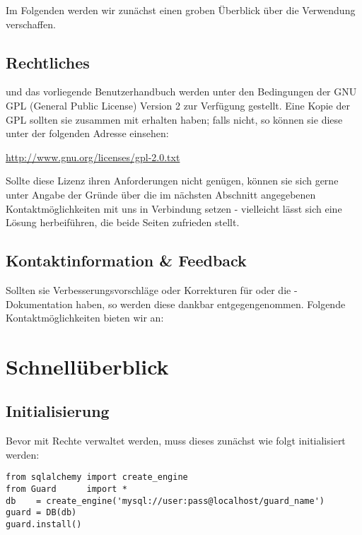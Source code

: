 Im Folgenden werden wir zunächst einen groben Überblick über die Verwendung 
\product verschaffen.

\subsection{Rechtliches}

\product und das vorliegende Benutzerhandbuch werden unter den Bedingungen 
der GNU GPL (General Public License) Version 2 zur Verfügung gestellt. Eine 
Kopie der GPL sollten sie zusammen mit \product erhalten haben; falls nicht, 
so können sie diese unter der folgenden Adresse einsehen:

\vspace{1em}
\url{http://www.gnu.org/licenses/gpl-2.0.txt}
\vspace{1em}

Sollte diese Lizenz ihren Anforderungen nicht genügen, können sie sich 
gerne unter Angabe der Gründe über die im nächsten Abschnitt 
angegebenen Kontaktmöglichkeiten mit uns in Verbindung setzen - vielleicht 
lässt sich eine Lösung herbeiführen, die beide Seiten zufrieden stellt.


\subsection{Kontaktinformation \& Feedback}

Sollten sie Verbesserungsvorschläge oder Korrekturen für \product oder 
die \product-Dokumentation haben, so werden diese dankbar entgegengenommen.
Folgende Kontaktmöglichkeiten bieten wir an: \\



\newpage
\section{Schnellüberblick}
\subsection{Initialisierung}

Bevor mit \product Rechte verwaltet werden, muss dieses zunächst wie 
folgt initialisiert werden:

\begin{lstlisting}
from sqlalchemy import create_engine
from Guard      import *
db    = create_engine('mysql://user:pass@localhost/guard_name')
guard = DB(db)
guard.install()
\end{lstlisting}

